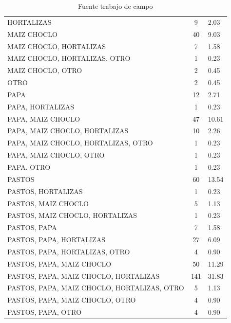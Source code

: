 \documentclass{article}\usepackage[]{graphicx}\usepackage[table]{xcolor}
\newenvironment{tablas}[2]
{\begin{table}[H]
		\centering
		\caption{#1}
		#2
		\caption*{Fuente trabajo de campo}}
	{\end{table}}
\begin{document}
\begin{tablas}
{Produccion predominante}{

\begin{tabular}{lcl}
\toprule
\cellcolor[HTML]{87A96B}{\textcolor{black}{\textbf{Cultivo}}} & \cellcolor[HTML]{87A96B}{\textcolor{black}{\textbf{Conteo}}} & \cellcolor[HTML]{87A96B}{\textcolor{black}{\textbf{Porcentaje}}}\\
\midrule
HORTALIZAS & 9 & 2.03\\
MAIZ CHOCLO & 40 & 9.03\\
MAIZ CHOCLO, HORTALIZAS & 7 & 1.58\\
MAIZ CHOCLO, HORTALIZAS, OTRO & 1 & 0.23\\
MAIZ CHOCLO, OTRO & 2 & 0.45\\
\addlinespace
OTRO & 2 & 0.45\\
PAPA & 12 & 2.71\\
PAPA, HORTALIZAS & 1 & 0.23\\
PAPA, MAIZ CHOCLO & 47 & 10.61\\
PAPA, MAIZ CHOCLO, HORTALIZAS & 10 & 2.26\\
\addlinespace
PAPA, MAIZ CHOCLO, HORTALIZAS, OTRO & 1 & 0.23\\
PAPA, MAIZ CHOCLO, OTRO & 1 & 0.23\\
PAPA, OTRO & 1 & 0.23\\
PASTOS & 60 & 13.54\\
PASTOS, HORTALIZAS & 1 & 0.23\\
\addlinespace
PASTOS, MAIZ CHOCLO & 5 & 1.13\\
PASTOS, MAIZ CHOCLO, HORTALIZAS & 1 & 0.23\\
PASTOS, PAPA & 7 & 1.58\\
PASTOS, PAPA, HORTALIZAS & 27 & 6.09\\
PASTOS, PAPA, HORTALIZAS, OTRO & 4 & 0.90\\
\addlinespace
PASTOS, PAPA, MAIZ CHOCLO & 50 & 11.29\\
PASTOS, PAPA, MAIZ CHOCLO, HORTALIZAS & 141 & 31.83\\
PASTOS, PAPA, MAIZ CHOCLO, HORTALIZAS, OTRO & 5 & 1.13\\
PASTOS, PAPA, MAIZ CHOCLO, OTRO & 4 & 0.90\\
PASTOS, PAPA, OTRO & 4 & 0.90\\
\bottomrule
\end{tabular}


}
\end{tablas}
\end{document}
